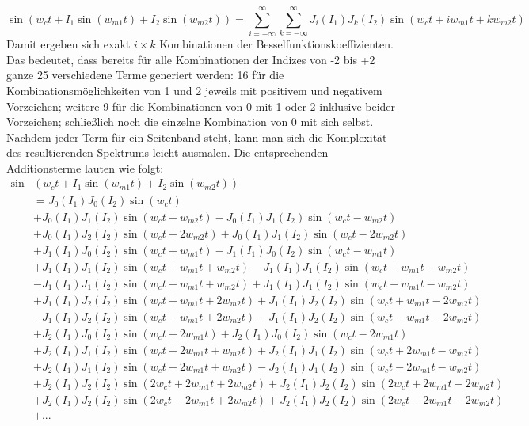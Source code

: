 \begin{equation}\label{eq:ParallelKompakt}
\sin(w_ct + I_1\sin(w_{m1}t) + I_2\sin(w_{m2}t)) = \sum_{i=-\infty}^{\infty}\sum_{k=-\infty}^{\infty}J_i(I_1)J_k(I_2)\sin(w_ct + iw_{m1}t + kw_{m2}t)
\end{equation}
Damit ergeben sich exakt $i \times k$ Kombinationen der Besselfunktionskoeffizienten. Das bedeutet, dass bereits für alle Kombinationen der Indizes von -2 bis +2 ganze 25 verschiedene Terme generiert werden: 16 für die Kombinationsmöglichkeiten von 1 und 2 jeweils mit positivem und negativem Vorzeichen; weitere 9 für die Kombinationen von 0 mit 1 oder 2 inklusive beider Vorzeichen; schließlich noch die einzelne Kombination von 0 mit sich selbst. Nachdem jeder Term für ein Seitenband steht, kann man sich die Komplexität des resultierenden Spektrums leicht ausmalen. Die entsprechenden Additionsterme lauten wie folgt:
\begin{equation}\label{eq:wallofequations}
\begin{split}
\sin&(w_ct + I_1\sin(w_{m1}t) + I_2\sin(w_{m2}t)) \\
&= J_0(I_1)J_0(I_2)\sin(w_ct) \\
&+ J_0(I_1)J_1(I_2)\sin(w_ct + w_{m2}t) - J_0(I_1)J_1(I_2)\sin(w_ct - w_{m2}t) \\
&+ J_0(I_1)J_2(I_2)\sin(w_ct + 2w_{m2}t) + J_0(I_1)J_1(I_2)\sin(w_ct - 2w_{m2}t) \\
&+ J_1(I_1)J_0(I_2)\sin(w_ct + w_{m1}t) - J_1(I_1)J_0(I_2)\sin(w_ct - w_{m1}t) \\
&+ J_1(I_1)J_1(I_2)\sin(w_ct + w_{m1}t + w_{m2}t) - J_1(I_1)J_1(I_2)\sin(w_ct + w_{m1}t - w_{m2}t) \\
&- J_1(I_1)J_1(I_2)\sin(w_ct - w_{m1}t + w_{m2}t) + J_1(I_1)J_1(I_2)\sin(w_ct - w_{m1}t - w_{m2}t) \\
&+ J_1(I_1)J_2(I_2)\sin(w_ct + w_{m1}t + 2w_{m2}t) + J_1(I_1)J_2(I_2)\sin(w_ct + w_{m1}t - 2w_{m2}t) \\
&- J_1(I_1)J_2(I_2)\sin(w_ct - w_{m1}t + 2w_{m2}t) - J_1(I_1)J_2(I_2)\sin(w_ct - w_{m1}t - 2w_{m2}t) \\
&+ J_2(I_1)J_0(I_2)\sin(w_ct + 2w_{m1}t) + J_2(I_1)J_0(I_2)\sin(w_ct - 2w_{m1}t) \\
&+ J_2(I_1)J_1(I_2)\sin(w_ct + 2w_{m1}t + w_{m2}t) + J_2(I_1)J_1(I_2)\sin(w_ct + 2w_{m1}t - w_{m2}t) \\
&+ J_2(I_1)J_1(I_2)\sin(w_ct - 2w_{m1}t + w_{m2}t) - J_2(I_1)J_1(I_2)\sin(w_ct - 2w_{m1}t - w_{m2}t) \\
&+ J_2(I_1)J_2(I_2)\sin(2w_ct + 2w_{m1}t + 2w_{m2}t) + J_2(I_1)J_2(I_2)\sin(2w_ct + 2w_{m1}t - 2w_{m2}t) \\
&+ J_2(I_1)J_2(I_2)\sin(2w_ct - 2w_{m1}t + 2w_{m2}t) + J_2(I_1)J_2(I_2)\sin(2w_ct - 2w_{m1}t - 2w_{m2}t) \\
&+ ... 
\end{split}
\end{equation}
